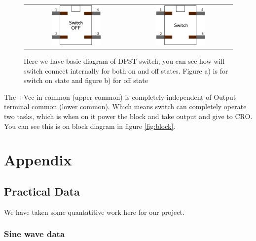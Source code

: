 \documentclass[14pt,a4paper]{extarticle}
\begin{document}
\begin{figure}[H]
\centering
\begin{tabular}{cc}
    \includegraphics[width=0.5\textwidth]{imgs/switch.png}&
    \includegraphics[width=0.5\textwidth]{imgs/switchoff.png}
\end{tabular}
\caption{Here we have basic diagram of DPST switch, you can see how will switch connect internally for both on and off states. Figure a) is for switch on state and figure b) for off state}
\label{fig:switch}    
\end{figure}


The +Vcc in common (upper common) is completely independent of Output terminal common (lower common). Which means switch can completely operate two tasks, which is when on it power the block and take output and give to CRO. You can see this is on block diagram in figure \ref{fig:block}.


\section{Appendix}
\label{sec:org235bff2}

\subsection{Practical Data}
\label{sec:org93b7e22}
We have taken some quantatitive work here for our project. 
\subsubsection{Sine wave data}
\label{sec:org4b176f4}
\end{document}
